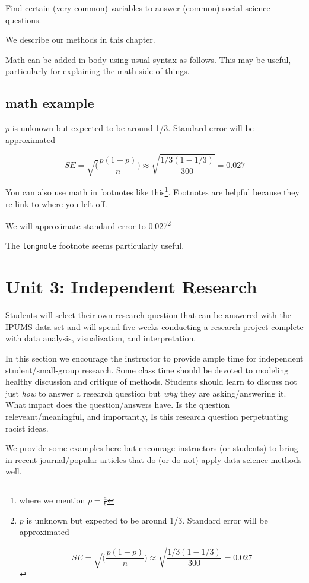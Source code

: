 \documentclass[
]{book}
\begin{document}
Find certain (very common) variables to answer (common) social science questions.

We describe our methods in this chapter.

Math can be added in body using usual syntax as follows. This may be useful, particularly for explaining the math side of things.

\hypertarget{math-example}{%
\section{math example}\label{math-example}}

\(p\) is unknown but expected to be around 1/3. Standard error will be approximated

\[
SE = \sqrt(\frac{p(1-p)}{n}) \approx \sqrt{\frac{1/3 (1 - 1/3)} {300}} = 0.027
\]

You can also use math in footnotes like this\footnote{where we mention \(p = \frac{a}{b}\)}. Footnotes are helpful because they re-link to where you left off.

We will approximate standard error to 0.027\footnote{\(p\) is unknown but expected to be around 1/3. Standard error will be approximated

  \[
  SE = \sqrt(\frac{p(1-p)}{n}) \approx \sqrt{\frac{1/3 (1 - 1/3)} {300}} = 0.027
  \]}

The \texttt{longnote} footnote seems particularly useful.

\hypertarget{unit3}{%
\chapter{Unit 3: Independent Research}\label{unit3}}

Students will select their own research question that can be answered with the IPUMS data set and will spend five weeks conducting a research project complete with data analysis, visualization, and interpretation.

In this section we encourage the instructor to provide ample time for independent student/small-group research. Some class time should be devoted to modeling healthy discussion and critique of methods. Students should learn to discuss not just \emph{how} to answer a research question but \emph{why} they are asking/answering it. What impact does the question/answers have. Is the question releveant/meaningful, and importantly, Is this research question perpetuating racist ideas.

We provide some examples here but encourage instructors (or students) to bring in recent journal/popular articles that do (or do not) apply data science methods well.
\end{document}
